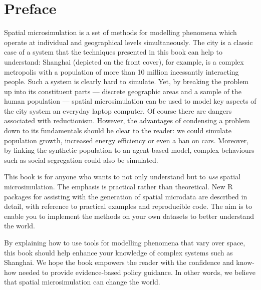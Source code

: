 \chapter*{Preface}

Spatial microsimulation is a set of methods for modelling phenomena which operate
at individual and geographical levels simultaneously.
The city is a classic case of a system that the techniques
presented in this book can help to understand: Shanghai
(depicted on the front cover), for example, is a complex metropolis with a
population of more than 10 million incessantly interacting people. Such a system is clearly hard
to simulate. Yet, by breaking the problem up into its
constituent parts --- discrete geographic areas and a sample of the human
population --- spatial microsimulation can be used to model key aspects of the city system
an everyday laptop computer. Of course there are dangers associated with reductionism.
However, the advantages of condensing a problem down to its fundamentals
should be clear to the reader:
we could simulate population growth, increased energy efficiency or even
a ban on cars. Moreover, by linking the synthetic population
to an agent-based model, complex
behaviours such as social segregation could also be simulated.

This book is for anyone who wants to not only understand
but to \emph{use} spatial microsimulation.
The emphasis is practical rather than theoretical.
New R packages for assisting with the generation of spatial microdata are described in
detail, with reference to practical examples and reproducible code.
The aim is to enable you to implement the methods on your own
datasets to better understand the world. 

By explaining how to use tools for modelling
phenomena that vary over space,
this book should help enhance your knowledge of
complex systems such as Shanghai.
We hope the book empowers the reader with the confidence and know-how
needed to provide evidence-based policy guidance.
In other words, we believe that spatial microsimulation can change the world.


